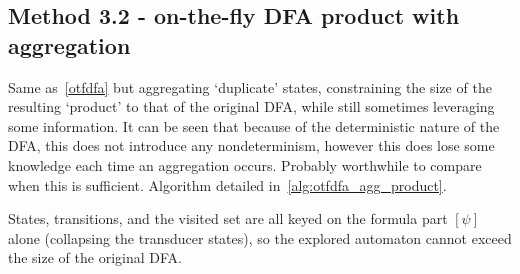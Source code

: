 \documentclass{article}
\begin{document}
\subsection{Method 3.2 - on-the-fly DFA product with aggregation}\label{otfagg}
Same as~\cref{otfdfa} but aggregating `duplicate' states, constraining the size of the resulting `product' to that of the original DFA, while still sometimes leveraging some information. It can be seen that because of the deterministic nature of the DFA, this does not introduce any nondeterminism, however this does lose some knowledge each time an aggregation occurs. Probably worthwhile to compare when this is sufficient. Algorithm detailed in~\cref{alg:otfdfa_agg_product}.

States, transitions, and the visited set are all keyed on the formula part $[\psi]$ alone (collapsing the transducer states), so the explored automaton cannot exceed the size of the original DFA.
\end{document}
